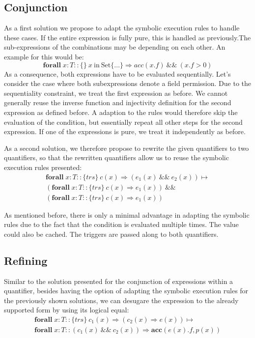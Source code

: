 \documentclass[12pt]{article}
\begin{document}
\subsection{Conjunction}
As a first solution we propose to adapt the symbolic execution rules to handle these cases.
If the entire expression is fully pure, this is handled as previously.The sub-expressions of the combinations may be depending on each other. An example for this would be: 
\begin{equation}
\label{eq1}
	\mathbf{forall} \; x:T :: \{\}\  x\ \mathrm{in \ Set} \{\dots\} \Rightarrow acc(x.f) \ \&\& \ (x.f > 0)
\end{equation}
As a consequence, both expressions have to be evaluated sequentially. 
Let's consider the case where both subexpressions denote a field permission. Due to the sequentiality constraint, we treat the first expression as before. We cannot generally reuse the inverse function and injectivity definition for the second expression as defined before. A adaption to the rules would therefore skip the evaluation of the condition, but essentially repeat all other steps for the second expression.
If one of the expressions is pure, we treat it independently as before.

As a second solution, we therefore propose to rewrite the given quantifiers to two quantifiers, so that the rewritten quantifiers allow us to reuse the symbolic execution rules presented: 
\begin{equation}
\begin{aligned}
	\mathbf{forall} \; x:T :: \{trs\}\  c(x) \Rightarrow (e_1(x)\ \&\& \ e_2(x))  \mapsto \\
	(\mathbf{forall} \; x:T :: \{trs\}\   c(x)  \Rightarrow e_1(x)) \ \&\& \\
	(\mathbf{forall} \; x:T :: \{trs\}\   c(x) \Rightarrow  e_1(x))
\end{aligned}
\end{equation}

As mentioned before, there is only a minimal advantage in adapting the symbolic rules due to the fact that the condition is evaluated multiple times. The value could also be cached. The triggers are passed along to both quantifiers.

\subsection{Refining}
Similar to the solution presented for the conjunction of expressions within a quantifier, besides having the option of adapting the symbolic execution rules for the previously shown solutions, we can desugare the expression to the already supported form by using its logical equal:
\begin{equation}
\begin{aligned}
	\mathbf{forall} \; x:T ::  \{trs\}\ c_1(x) \Rightarrow (c_2(x) \Rightarrow e(x))  \mapsto \\
	\mathbf{forall} \; x:T ::( c_1(x) \:\&\&\: c_2(x)) \Rightarrow \mathbf{acc}(e(x).f, p(x))
\end{aligned}
\end{equation}
\end{document}
